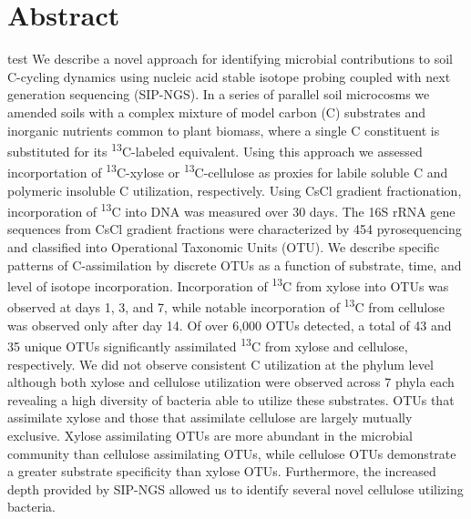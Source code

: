 \section{Abstract}
test
We describe a novel approach for identifying microbial contributions to soil C-cycling dynamics using nucleic acid stable isotope probing coupled with next generation sequencing (SIP-NGS). In a series of parallel soil microcosms we amended soils with a complex mixture of model carbon (C) substrates and inorganic nutrients common to plant biomass, where a single C constituent is substituted for its \textsuperscript{13}C-labeled equivalent. Using this approach we assessed incorportation of \textsuperscript{13}C-xylose or \textsuperscript{13}C-cellulose as proxies for labile soluble C and polymeric insoluble C utilization, respectively. Using CsCl gradient fractionation, incorporation of \textsuperscript{13}C into DNA was measured over 30 days. The 16S rRNA gene sequences from CsCl gradient fractions were characterized by 454 pyrosequencing and classified into Operational Taxonomic Units (OTU). We describe specific patterns of C-assimilation by discrete OTUs as a function of substrate, time, and level of isotope incorporation. Incorporation of \textsuperscript{13}C from xylose into OTUs was observed at days 1, 3, and 7, while notable incorporation of \textsuperscript{13}C from cellulose was observed only after day 14. Of over 6,000 OTUs detected, a total of 43 and 35 unique OTUs significantly assimilated \textsuperscript{13}C from xylose and cellulose, respectively. We did not observe consistent C utilization at the phylum level although both xylose and cellulose utilization were observed across 7 phyla each revealing a high diversity of bacteria able to utilize these substrates. OTUs that assimilate xylose and those that assimilate cellulose are largely mutually exclusive. Xylose assimilating OTUs are more abundant in the microbial community than cellulose assimilating OTUs, while cellulose OTUs demonstrate a greater substrate specificity than xylose OTUs. Furthermore, the increased depth provided by SIP-NGS allowed us to identify several novel cellulose utilizing bacteria.        

